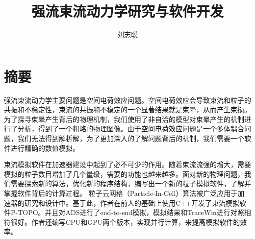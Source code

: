   \confidential{}%
  \title[强流束流动力学研究与软件开发]{强流束流动力学研究与软件开发}%
  \author{刘志聪}%
\maketitle
\makeenglishtitle
\makedeclaration
\chapter{摘\quad 要}%

强流束流动力学主要问题是空间电荷效应问题。空间电荷效应会导致束流和粒子的共振和不稳定性，束流的共振和不稳定的一个显著结果就是束晕，从而产生束损。为了探寻束晕产生背后的物理机制，我们使用了非自洽的模型对束晕产生的机制进行了分析，得到了一个粗略的物理图像。由于空间电荷效应问题是一个多体耦合问题，我们无法得到解析解，为了更加深入的了解问题背后的机制，我们需要一个软件进行精确的数值模拟。

束流模拟软件在加速器建设中起到了必不可少的作用。随着束流流强的增大，需要模拟的粒子数目增加了几个量级，需要的功能也越来越多。面对新的物理问题，我们需要探索新的算法，优化新的程序结构，编写出一个新的粒子模拟软件，了解并掌握软件背后的计算过程。
粒子云网格（Particle-In-Cell）算法被广泛应用于加速器的研究和设计中。基于此，作者在前人的基础上使用C++开发了束流模拟软件P-TOPO。并且对ADS进行了end-to-end模拟，模拟结果和TraceWin进行对照相符很好。作者还编写CPU和GPU两个版本，实现并行计算，来提高模拟软件的效率。

